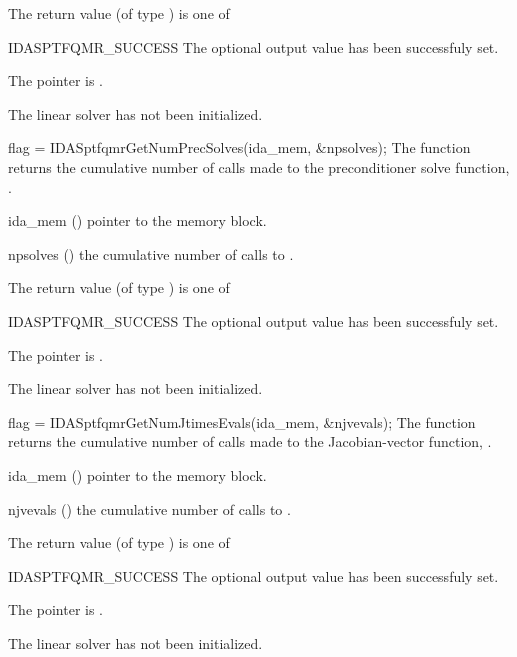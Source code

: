 {
  The return value  (of type ) is one of
  \begin{args}
  \item[IDASPTFQMR\_SUCCESS] 
    The optional output value has been successfuly set.
  \item[\Id{IDASPTFQMR\_MEM\_NULL}]
    The  pointer is .
  \item[\Id{IDASPTFQMR\_LMEM\_NULL}]
    The {\idasptfqmr} linear solver has not been initialized.
  \end{args}
}
{}
{
  flag = IDASptfqmrGetNumPrecSolves(ida\_mem, \&npsolves);
}
{
  The function  returns the
  cumulative number of calls made to the preconditioner 
  solve function, .
}
{
  \begin{args}[npsolves]
  \item[ida\_mem] ()
    pointer to the {\ida} memory block.
  \item[npsolves] ()
    the cumulative number of calls to .
  \end{args}
}
{
  The return value  (of type ) is one of
  \begin{args}
  \item[IDASPTFQMR\_SUCCESS] 
    The optional output value has been successfuly set.
  \item[\Id{IDASPTFQMR\_MEM\_NULL}]
    The  pointer is .
  \item[\Id{IDASPTFQMR\_LMEM\_NULL}]
    The {\idasptfqmr} linear solver has not been initialized.
  \end{args}
}
{}
{
  flag = IDASptfqmrGetNumJtimesEvals(ida\_mem, \&njvevals);
}
{
  The function  returns the
  cumulative number of calls made to the Jacobian-vector function,
  .
}
{
  \begin{args}[njvevals]
  \item[ida\_mem] ()
    pointer to the {\ida} memory block.
  \item[njvevals] ()
    the cumulative number of calls to .
  \end{args}
}
{
  The return value  (of type ) is one of
  \begin{args}
  \item[IDASPTFQMR\_SUCCESS] 
    The optional output value has been successfuly set.
  \item[\Id{IDASPTFQMR\_MEM\_NULL}]
    The  pointer is .
  \item[\Id{IDASPTFQMR\_LMEM\_NULL}]
    The {\idasptfqmr} linear solver has not been initialized.
  \end{args}
}
